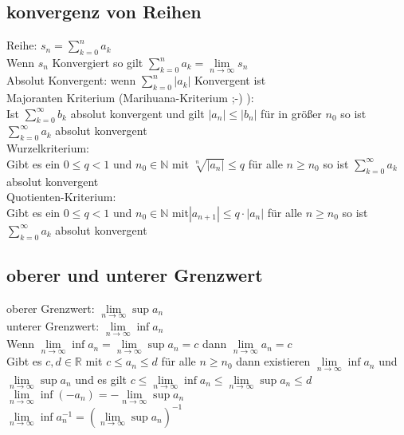 \documentclass[a4paper]{scrartcl}
\begin{document}
\subsection{konvergenz von Reihen}
Reihe: $s_n = \sum \limits ^n _{k=0} a_k$\\
Wenn $s_n$ Konvergiert so gilt $\sum \limits ^n _{k=0} a_k = \lim\limits_{n\to \infty} s_n  $\\
Absolut Konvergent: wenn $\sum \limits ^n _{k=0} |a_k|$ Konvergent ist\\
Majoranten Kriterium (Marihuana-Kriterium ;-) ):\\
Ist $\sum \limits ^{\infty} _{k=0} b_k$ absolut konvergent und gilt $|a_n| \leq |b_n|$ für in größer $n_0$ so ist $\sum \limits ^{\infty} _{k=0} a_k$ absolut konvergent\\
Wurzelkriterium:\\
Gibt es ein $0 \leq q < 1$ und $n_0 \in \mathbb{N}$ mit $\sqrt[n]{|a_n|} \leq q$ für alle $n \geq n_0$ so ist $\sum \limits ^{\infty} _{k=0} a_k$ absolut konvergent\\
Quotienten-Kriterium:\\
Gibt es ein $0 \leq q < 1$ und $n_0 \in \mathbb{N}$ mit$|a_{n+1}| \leq q \cdot |a_n|$  für alle $n \geq n_0$ so ist $\sum \limits ^{\infty} _{k=0} a_k$ absolut konvergent\\
\subsection{oberer und unterer Grenzwert}
oberer Grenzwert: $\lim\limits_{n\to\infty}\sup a_n$\\
unterer Grenzwert: $\lim\limits_{n\to\infty}\inf a_n$\\
Wenn $\lim\limits_{n\to\infty}\inf a_n = \lim\limits_{n\to\infty}\sup a_n = c$ dann $\lim\limits_{n\to\infty} a_n = c$ \\
Gibt es $c,d \in \mathbb{R}$ mit $c \leq a_n \leq d$ für alle $n \geq n_0$ dann existieren $\lim\limits_{n\to\infty}\inf a_n $ und  $\lim\limits_{n\to\infty}\sup a_n$ und es gilt
$c \leq \lim\limits_{n\to\infty}\inf a_n \leq \lim\limits_{n\to\infty}\sup a_n \leq d$\\
$\lim\limits_{n\to\infty}\inf (-a_n) = - \lim\limits_{n\to\infty}\sup a_n$\\
$\lim\limits_{n\to\infty}\inf a_n^{-1} = (\lim\limits_{n\to\infty}\sup a_n)^{-1}$\\
\end{document}
